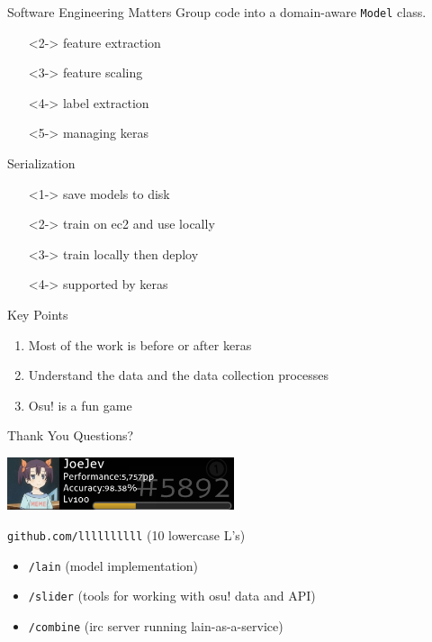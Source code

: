 \documentclass[table]{beamer}
\begin{document}
\begin{frame}{Software Engineering Matters}
  Group code into a domain-aware \texttt{Model} class.

  \begin{itemize}
  \item[]<2-> feature extraction
  \item[]<3-> feature scaling
  \item[]<4-> label extraction
  \item[]<5-> managing keras
  \end{itemize}
\end{frame}

\begin{frame}{Serialization}
  \begin{itemize}
  \item[]<1-> save models to disk
  \item[]<2-> train on ec2 and use locally
  \item[]<3-> train locally then deploy
  \item[]<4-> supported by keras
  \end{itemize}
\end{frame}

\begin{frame}{Key Points}
  \begin{enumerate}
  \item<1-> Most of the work is before or after keras
  \item<2-> Understand the data and the data collection processes
  \item<3-> Osu! is a fun game
  \end{enumerate}
\end{frame}

\begin{frame}{Thank You}
  Questions?

  \begin{center}
    \includegraphics[width=0.50\textwidth]{images/osu-profile.png}
  \end{center}

  \begin{block}{\texttt{github.com/llllllllll} (10 lowercase L's)}
    \begin{itemize}
    \item \texttt{/lain} (model implementation)
    \item \texttt{/slider} (tools for working with osu! data and API)
    \item \texttt{/combine} (irc server running lain-as-a-service)
    \end{itemize}
  \end{block}
\end{frame}
\end{document}
